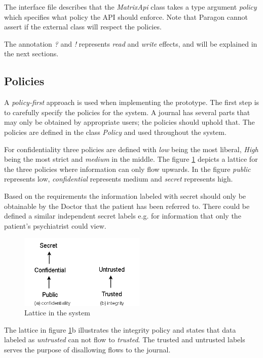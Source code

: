 The interface file describes that the \emph{MatrixApi} class takes a type argument \emph{policy} which specifies what policy the API should enforce. Note that Paragon cannot assert if the external class will respect the policies.

The annotation \emph{?} and \emph{!} represents \emph{read} and \emph{write} effects, and will be explained in the next sections.
 
\subsection{Policies}\label{policies} 

A \emph{policy-first} approach is used when implementing the prototype. The first step is to carefully specify the policies for the system. A journal has several parts that may only be obtained by appropriate users; the policies should uphold that. The policies are defined in the class \emph{Policy} and used throughout the system.

For confidentiality three policies are defined with \emph{low} being the most liberal, \emph{High} being the most strict and \emph{medium} in the middle. The figure \ref{fig:lattice_confidentiality} depicts a lattice for the three policies where information can only flow upwards. In the figure \emph{public} represents low, \emph{confidential} represents medium and \emph{secret} represents high. 

Based on the requirements the information labeled with secret should only be obtainable by the Doctor that the patient has been referred to. There could be defined a similar independent secret labels e.g. for information that only the patient's psychiatrist could view.  


\begin{figure}[H] 
	\centering
	\includegraphics[width=6cm]{figures/lattice_confidentiality.png}
	\caption{Lattice in the system}
	\label{fig:lattice_confidentiality}
\end{figure}

The lattice in figure \ref{fig:lattice_confidentiality}b illustrates the integrity policy and states that data labeled as \emph{untrusted} can not flow to \emph{trusted}. The trusted and untrusted labels serves the purpose of disallowing flows to the journal.

